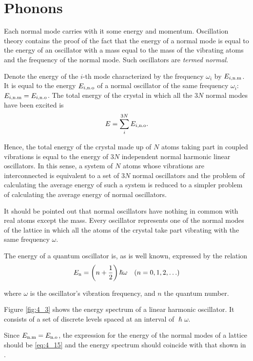 \section{Phonons}\label{sec:32}

Each normal mode carries with it some energy and momentum. Oscillation theory contains the proof of the fact that the energy of a normal mode is equal to the energy of an oscillator with a mass equal to the mass of the vibrating atoms and the frequency of the normal mode. Such oscillators are \textit{termed normal}.

Denote the energy of the $i$-th mode characterized by the frequency $\omega_i$ by $E_{\text{$i$,n.m}}$. It is equal to the energy $E_{\text{$i$,n.o}}$ of a normal oscillator of
the same frequency $\omega_i$: $E_{\text{$i$,n.m}}=E_{\text{$i$,n.o}}$. The total energy of the crystal in which all the $3N$ normal modes have been excited is
\begin{equation*}
    E = \sum_i^{3N} E_{\text{$i$,n.o}}.
\end{equation*}

Hence, the total energy of the crystal made up of $N$ atoms taking part in coupled vibrations is equal to the energy of $3N$ independent normal harmonic linear oscillators. In this sense, a system of $N$ atoms whose vibrations are interconnected is equivalent to a set of $3N$ normal oscillators and the problem of calculating the average energy of such a system is reduced to a simpler problem of calculating the average energy of normal oscillators.

It should be pointed out that normal oscillators have nothing in common with real atoms except the mass. Every oscillator represents one of the normal modes of the lattice in which all the atoms of the crystal take part vibrating with the same frequency $\omega$.

The energy of a quantum oscillator is, as is well known, expressed by the relation
\begin{equation}\label{eq:4_15}
    E_{\text{n}} = \left(n + \frac{1}{2}\right) \hslash \omega \quad (n=0,1,2,\ldots)
\end{equation}

\noindent
where $\omega$ is the oscillator's vibration frequency, and $n$ the quantum number.

Figure \ref{fig:4_3} shows the energy spectrum of a linear harmonic oscillator. It consists of a set of discrete levels spaced at an interval of $\hslash\omega$.

Since $E_{\text{n.m}}=E_{\text{n.o}}$, the expression for the energy of the normal modes of a lattice should be \eqref{eq:4_15} and the energy spectrum should coincide with that shown in .

